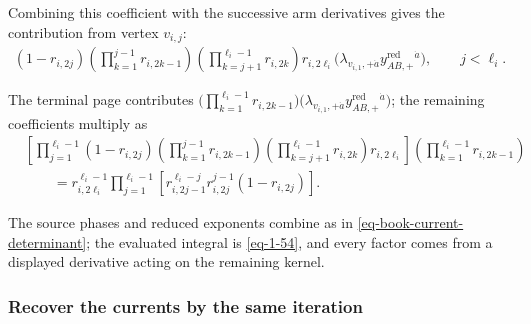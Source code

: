\documentclass[11pt]{article}
\numberwithin{equation}{section}
\numberwithin{figure}{section}
\numberwithin{table}{section}
\begin{document}
Combining this coefficient with the successive arm derivatives gives the contribution from vertex $v_{i,j}$:
\begin{equation}\label{eq-spider-jacobian-blocks}
\begin{gathered}
(1-r_{i,2j})
\left(\prod_{k=1}^{j-1}r_{i,2k-1}\right)
\left(\prod_{k=j+1}^{\ell_i-1}r_{i,2k}\right)
r_{i,2\ell_i}
\bigl(\lambda_{v_{i,1},+\dot a}y_{AB,+}^{\mathrm{red}}{}^{\dot a}\bigr),
\qquad j<\ell_i.
\end{gathered}
\end{equation}

The terminal page contributes $\bigl(\prod_{k=1}^{\ell_i-1}r_{i,2k-1}\bigr)\bigl(\lambda_{v_{i,1},+\dot a}y_{AB,+}^{\mathrm{red}}{}^{\dot a}\bigr)$; the remaining coefficients multiply as
\begin{equation}\label{eq-spider-final-block}
\begin{aligned}
&\left[\prod_{j=1}^{\ell_i-1}
(1-r_{i,2j})
\left(\prod_{k=1}^{j-1}r_{i,2k-1}\right)
\left(\prod_{k=j+1}^{\ell_i-1}r_{i,2k}\right)
r_{i,2\ell_i}\right]
\left(\prod_{k=1}^{\ell_i-1}r_{i,2k-1}\right)\\
&\qquad=r_{i,2\ell_i}^{\ell_i-1}
\prod_{j=1}^{\ell_i-1}
\left[r_{i,2j-1}^{\ell_i-j}r_{i,2j}^{j-1}(1-r_{i,2j})\right].
\end{aligned}
\end{equation}

The source phases and reduced exponents combine as in \eqref{eq-book-current-determinant}; the evaluated integral is \eqref{eq-1-54}, and every factor comes from a displayed derivative acting on the remaining kernel.

\subsubsection{Recover the currents by the same iteration}\label{sec-spider-jacobian}
\end{document}
